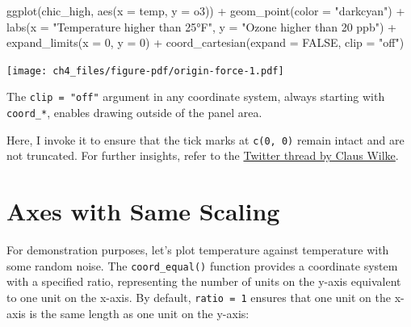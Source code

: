 \documentclass[
  letterpaper,
]{scrbook}
\newenvironment{Shaded}{\begin{snugshade}}{\end{snugshade}}
\newcommand{\AttributeTok}[1]{\textcolor[rgb]{0.40,0.45,0.13}{#1}}
\newcommand{\ConstantTok}[1]{\textcolor[rgb]{0.56,0.35,0.01}{#1}}
\newcommand{\DecValTok}[1]{\textcolor[rgb]{0.68,0.00,0.00}{#1}}
\newcommand{\FunctionTok}[1]{\textcolor[rgb]{0.28,0.35,0.67}{#1}}
\newcommand{\NormalTok}[1]{\textcolor[rgb]{0.00,0.23,0.31}{#1}}
\newcommand{\SpecialCharTok}[1]{\textcolor[rgb]{0.37,0.37,0.37}{#1}}
\newcommand{\StringTok}[1]{\textcolor[rgb]{0.13,0.47,0.30}{#1}}
\begin{document}
\begin{Shaded}
\begin{Highlighting}[]
\FunctionTok{ggplot}\NormalTok{(chic\_high, }\FunctionTok{aes}\NormalTok{(}\AttributeTok{x =}\NormalTok{ temp, }\AttributeTok{y =}\NormalTok{ o3)) }\SpecialCharTok{+}
  \FunctionTok{geom\_point}\NormalTok{(}\AttributeTok{color =} \StringTok{"darkcyan"}\NormalTok{) }\SpecialCharTok{+}
  \FunctionTok{labs}\NormalTok{(}\AttributeTok{x =} \StringTok{"Temperature higher than 25°F"}\NormalTok{,}
       \AttributeTok{y =} \StringTok{"Ozone higher than 20 ppb"}\NormalTok{) }\SpecialCharTok{+}
  \FunctionTok{expand\_limits}\NormalTok{(}\AttributeTok{x =} \DecValTok{0}\NormalTok{, }\AttributeTok{y =} \DecValTok{0}\NormalTok{) }\SpecialCharTok{+}
  \FunctionTok{coord\_cartesian}\NormalTok{(}\AttributeTok{expand =} \ConstantTok{FALSE}\NormalTok{, }\AttributeTok{clip =} \StringTok{"off"}\NormalTok{)}
\end{Highlighting}
\end{Shaded}

\texttt{[image: ch4\_files/figure-pdf/origin-force-1.pdf]}

\begin{tcolorbox}[enhanced jigsaw, rightrule=.15mm, arc=.35mm, title=\textcolor{quarto-callout-tip-color}{\faLightbulb}\hspace{0.5em}{Tip}, colback=white, toptitle=1mm, colbacktitle=quarto-callout-tip-color!10!white, breakable, left=2mm, opacityback=0, leftrule=.75mm, bottomrule=.15mm, bottomtitle=1mm, colframe=quarto-callout-tip-color-frame, coltitle=black, toprule=.15mm, opacitybacktitle=0.6, titlerule=0mm]

The \texttt{clip\ =\ "off"} argument in any coordinate system, always
starting with \texttt{coord\_*}, enables drawing outside of the panel
area.

\end{tcolorbox}

Here, I invoke it to ensure that the tick marks at \texttt{c(0,\ 0)}
remain intact and are not truncated. For further insights, refer to the
\href{https://twitter.com/clauswilke/status/991542952802619392?lang=en}{Twitter
thread by Claus Wilke}.

\section{Axes with Same Scaling}\label{axes-with-same-scaling}

For demonstration purposes, let's plot temperature against temperature
with some random noise. The \texttt{coord\_equal()} function provides a
coordinate system with a specified ratio, representing the number of
units on the y-axis equivalent to one unit on the x-axis. By default,
\texttt{ratio\ =\ 1} ensures that one unit on the x-axis is the same
length as one unit on the y-axis:
\end{document}
